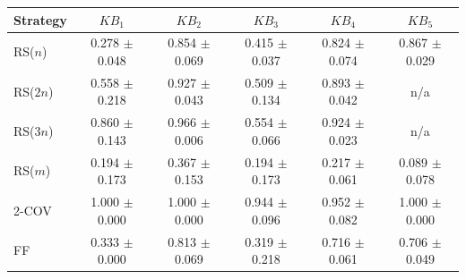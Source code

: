 \begin{tabular}{lccccc}
\toprule
Strategy & $KB_1$ & $KB_2$ & $KB_3$ & $KB_4$ & $KB_5$ \\
\midrule
RS($n$) & 0.278 $\pm$ 0.048 & 0.854 $\pm$ 0.069 & 0.415 $\pm$ 0.037 & 0.824 $\pm$ 0.074 & 0.867 $\pm$ 0.029 \\
RS($2n$) & 0.558 $\pm$ 0.218 & 0.927 $\pm$ 0.043 & 0.509 $\pm$ 0.134 & 0.893 $\pm$ 0.042 & n/a \\
RS($3n$) & 0.860 $\pm$ 0.143 & 0.966 $\pm$ 0.006 & 0.554 $\pm$ 0.066 & 0.924 $\pm$ 0.023 & n/a \\
RS($m$) & 0.194 $\pm$ 0.173 & 0.367 $\pm$ 0.153 & 0.194 $\pm$ 0.173 & 0.217 $\pm$ 0.061 & 0.089 $\pm$ 0.078 \\
2-COV & 1.000 $\pm$ 0.000 & 1.000 $\pm$ 0.000 & 0.944 $\pm$ 0.096 & 0.952 $\pm$ 0.082 & 1.000 $\pm$ 0.000 \\
FF & 0.333 $\pm$ 0.000 & 0.813 $\pm$ 0.069 & 0.319 $\pm$ 0.218 & 0.716 $\pm$ 0.061 & 0.706 $\pm$ 0.049 \\
\bottomrule
\end{tabular}
